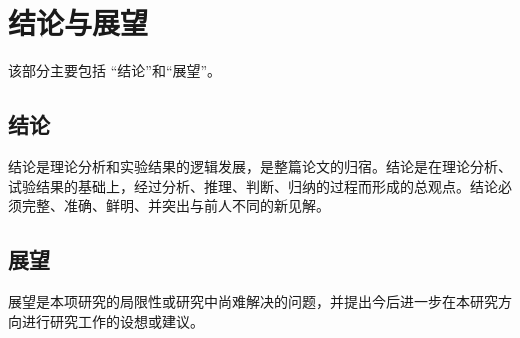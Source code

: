 
\section{结论与展望}

该部分主要包括 “结论”和“展望”。

\subsection{结论}

结论是理论分析和实验结果的逻辑发展，是整篇论文的归宿。结论是在理论分析、试验结果的基础上，经过分析、推理、判断、归纳的过程而形成的总观点。结论必须完整、准确、鲜明、并突出与前人不同的新见解。

\subsection{展望}

展望是本项研究的局限性或研究中尚难解决的问题，并提出今后进一步在本研究方向进行研究工作的设想或建议。
